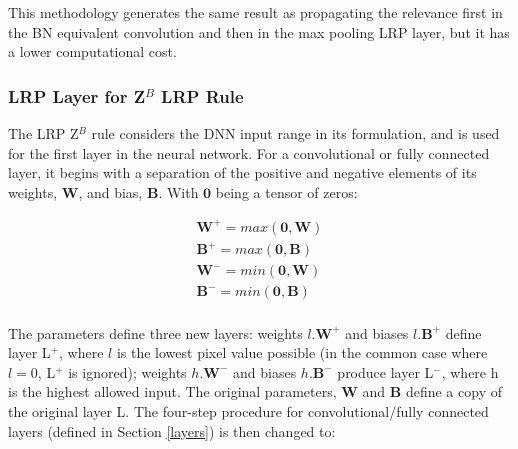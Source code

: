 \documentclass[fleqn,10pt]{wlscirep}
\begin{document}
{This methodology generates the same result as propagating the relevance first in the BN equivalent convolution and then in the max pooling LRP layer, but it has a lower computational cost.

\subsubsection{LRP Layer for Z$^{B}$ LRP Rule}
\label{lrpZb}

The LRP Z$^{B}$ rule\cite{LRPZb} considers the DNN input range in its formulation, and is used for the first layer in the neural network. For a convolutional or fully connected layer, it begins with a separation of the positive and negative elements of its weights, $\bm{W}$, and bias, $\bm{B}$. With $\bm{0}$ being a tensor of zeros:


\begin{gather}
\bm{W}^{+}=max(\bm{0},\bm{W})\\
\bm{B}^{+}=max(\bm{0},\bm{B})\\
\bm{W}^{-}=min(\bm{0},\bm{W})\\
\bm{B}^{-}=min(\bm{0},\bm{B})\\
\end{gather}

The parameters define three new layers: weights $l.\bm{W}^{+}$ and biases $l.\bm{B}^{+}$ define layer L$^{+}$, where $l$ is the lowest pixel value possible (in the common case where $l=0$, L$^{+}$ is ignored); weights $h.\bm{W}^{-}$ and biases $h.\bm{B}^{-}$ produce layer L$^{-}$, where h is the highest allowed input. The original parameters, $\bm{W}$ and $\bm{B}$ define a copy of the original layer L. The four-step procedure for convolutional/fully connected layers (defined in Section \ref{layers}) is then changed to:

}
\end{document}
